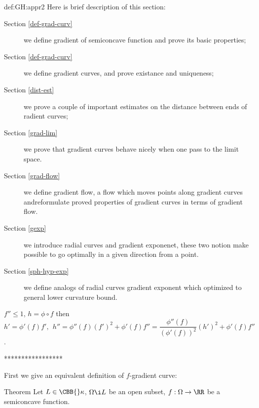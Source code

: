 {\begin{subthm}{def:GH:appr2}
Here is brief description of this section:
\begin{description}
\item[Section \ref{def-grad-curv}] we define gradient of semiconcave function and prove its basic properties;
\item[Section \ref{def-grad-curv}] we define gradient curves, and prove existance and uniqueness;
\item[Section \ref{dist-est}] we prove a couple of important estimates on the distance between ends of radient curves;
\item[Section \ref{grad-lim}] we prove that gradient curves behave nicely when one pass to the limit space.
\item[Section \ref{grad-flow}] we define gradient flow, a flow which moves points along gradient curves andreformulate proved properties of gradient curves in terms of gradient flow.
\item[Section \ref{gexp}] we introduce radial curves and gradient exponenet, these two notion make possible to go optimally in a given direction from a point.
\item[Section \ref{sph-hyp-exp}] we define analogs of radial curves gradient exponent which optimized to general lower curvature bound.
\end{description}














$f''\le 1$, $h=\phi\circ f$ then $$h'=\phi'(f)f',\ \ h''=\phi''(f)(f')^2+\phi'(f)f''=\frac{\phi''(f)}{(\phi'(f))^2}(h')^2+\phi'(f)f''$$.























*****************

First we give an equivalent definition of $f$-gradient curve:

\begin{thm}{Theorem}
Let $L\in \CBB{}\kappa$, 
$\Omega\i L$ be an open subset,
$f:\Omega\to\RR$ be a semiconcave function.


\end{thm}
\end{subthm}}
